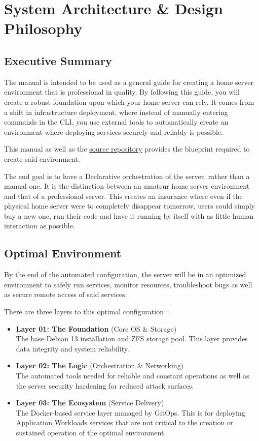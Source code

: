 \chapter{System Architecture \& Design Philosophy} \label{chap:architecture}
\section{Executive Summary}
The manual is intended to be used as a general guide for creating a home server environment that is professional in quality.
By following this guide, you will create a robust foundation upon which your home server can rely.
It comes from a shift in infrastructure deployment, where instead of manually entering commands in the CLI, you use external tools to automatically create an environment where deploying services securely and reliably is possible. 

This manual as well as the \href{\githubrepo}{source repository} provides the blueprint required to create said environment.

The end goal is to have a Declarative orchestration of the server, rather than a manual one. It is the distinction between an amateur home server environment and that of a professional server. This creates an insurance where even if the physical home server were to completely disappear tomorrow, users could simply buy a new one, run their code and have it running by itself with as little human interaction as possible. 

\section{Optimal Environment}
By the end of the automated configuration, the server will be in an optimized environment to safely run services, monitor resources, troubleshoot bugs as well as secure remote access of said services.

There are three layers to this optimal configuration :

\begin{itemize}
	\item \textbf{Layer 01: The Foundation} (Core OS \& Storage) \\
	The base Debian 13 installation and ZFS storage pool. This layer provides data integrity and system reliability.
	\item \textbf{Layer 02: The Logic} (Orchestration \& Networking) \\
	The automated tools needed for reliable and constant operations as well as the server security hardening for reduced attack surfaces.
	\item \textbf{Layer 03: The Ecosystem} (Service Delivery) \\
	The Docker-based service layer managed by GitOps. This is for deploying Application Workloads services that are not critical to the creation or sustained operation of the optimal environment.
\end{itemize}